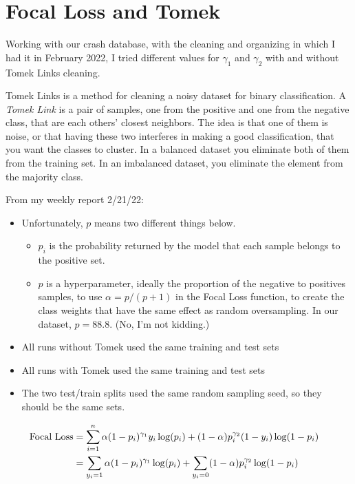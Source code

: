 \section{Focal Loss and Tomek}
\label{sec:Focal_Loss_and_Tomek}

Working with our crash database, with the cleaning and organizing in which I had it in February 2022, I tried different values for $\gamma_1$ and $\gamma_2$ with and without Tomek Links cleaning.  

Tomek Links is a method for cleaning a noisy dataset for binary classification.  A {\it Tomek Link} is a pair of samples, one from the positive and one from the negative class, that are each others' closest neighbors.  The idea is that one of them is noise, or that having these two interferes in making a good classification, that you want the classes to cluster.  In a balanced dataset you eliminate both of them from the training set.  In an imbalanced dataset, you eliminate the element from the majority class.  

From my weekly report 2/21/22:

\begin{itemize}
	\item Unfortunately, $p$ means two different things below.  
	\begin{itemize}
		\item $p_i$ is the probability returned by the model that each sample belongs to the positive set.
		\item $p$ is a hyperparameter, ideally the proportion of the negative to positives samples, to use $\alpha = p/(p+1)$ in the Focal Loss function, to create the class weights that have the same effect as random oversampling.  In our dataset, $p=88.8$.  (No, I'm not kidding.)
	\end{itemize}
	\item All runs without Tomek used the same training and test sets
	\item All runs with Tomek used the same training and test sets
	\item The two test/train splits used the same random sampling seed, so they should be the same sets.
\end{itemize}


\begin{align*}
	\text{Focal Loss} &= \sum_{i=1}^n \alpha (1 - p_i) ^{\gamma_1} y_i \log (p_i) + (1 - \alpha) p_i^{\gamma_2} (1 - y_i)  \log (1 - p_i) \cr
	 &= \sum_{y_i=1} \alpha (1 - p_i) ^{\gamma_1} \log (p_i) + \sum_{y_i=0} (1 - \alpha) p_i^{\gamma_2}   \log (1 - p_i) \cr
	\end{align*}

